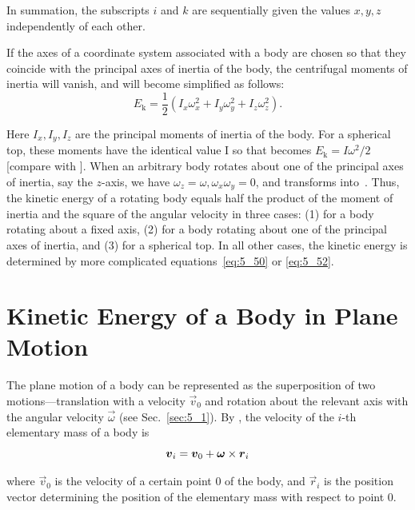 \noindent
In summation, the subscripts $i$ and $k$ are sequentially given the values $x, y, z$ independently of each other.

If the axes of a coordinate system associated with a body are chosen so that they coincide with the principal axes of inertia of the body, the centrifugal moments of inertia will vanish, and  will become simplified as follows:
\begin{equation}\label{eq:5_52}
	E_{\text{k}} = \frac{1}{2}(I_x\omega_x^2 + I_y\omega_y^2 + I_z\omega_z^2).
\end{equation}

\noindent
Here $I_x, I_y, I_z$ are the principal moments of inertia of the body. For a spherical top, these moments have the identical value I so that  becomes $E_{\text{k}}=I\omega^2/2$ [compare with ]. When an arbitrary body rotates about one of the principal axes of inertia, say the $z$-axis, we have $\omega_z=\omega, \omega_x\omega_y=0$, and  transforms into~. Thus, the kinetic energy of a rotating body equals half the product of the moment of inertia and the square of the angular velocity in three cases: (1) for a body rotating about a fixed axis, (2) for a body rotating about one of the principal axes of inertia, and (3) for a spherical top. In all other cases, the kinetic energy is determined by more complicated equations~\eqref{eq:5_50} or \eqref{eq:5_52}.

\section{Kinetic Energy of a Body in Plane Motion}\label{sec:5_7}

\vspace{-5pt}

The plane motion of a body can be represented as the superposition of two mo\-tions---translation with a velocity $\vec{v}_0$ and rotation about the relevant axis with the angular velocity $\vec{\omega}$ (see Sec.~\ref{sec:5_1}). By , the velocity of the $i$-th elementary mass of a body is
\begin{equation*}
	\boldsymbol{v}_i = \boldsymbol{v}_0 + \boldsymbol{\omega}\times\boldsymbol{r}_i
\end{equation*}

\noindent
where $\vec{v}_0$ is the velocity of a certain point $0$ of the body, and $\vec{r}_i$ is the position vector determining the position of the elementary mass with respect to point $0$.

